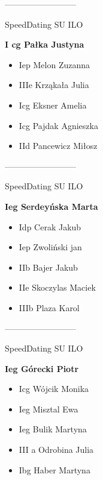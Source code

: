 \documentclass[a4paper,10pt]{article}
\begin{document}
\begin{multicols}{3}
\begin{minipage}[l]{\textwidth}
\begin{itemize}
    \end{itemize}



\end{minipage}



\begin{minipage}[l]{\textwidth}
--------------------------

  \footnotesize{SpeedDating SU ILO}

  \bfseries{I cg Pałka Justyna}

  \begin{itemize}
    \item Iep Melon Zuzanna
    \item IIIe Krząkała Julia
    \item Icg Eksner Amelia
    \item Icg Pajdak Agnieszka
    \item IId Pancewicz Miłosz

    \end{itemize}



\end{minipage}



\begin{minipage}[l]{\textwidth}
--------------------------

  \footnotesize{SpeedDating SU ILO}

  \bfseries{Ieg Serdeyńska Marta}

  \begin{itemize}
    \item Idp Cerak Jakub
    \item Iep Zwoliński jan
    \item IIb Bajer Jakub
    \item IIe Skoczylas Maciek
    \item IIIb Plaza Karol

    \end{itemize}



\end{minipage}



\begin{minipage}[l]{\textwidth}
--------------------------

  \footnotesize{SpeedDating SU ILO}

  \bfseries{Ieg Górecki Piotr}

  \begin{itemize}
    \item Icg Wójcik Monika
    \item Ieg Misztal Ewa
    \item Ieg Bulik Martyna
    \item III a Odrobina Julia
    \item Ibg Haber Martyna


\end{itemize}
\end{minipage}
\end{multicols}
\end{document}

